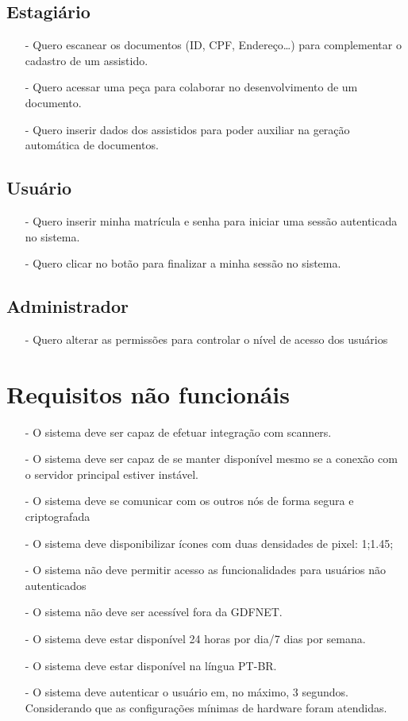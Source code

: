 \documentclass[12pt,a4paper]{report}
\begin{document}
\section{Estagiário}
\begin{itemize}
\item[-] Quero escanear os documentos (ID, CPF, Endereço…) para complementar o cadastro de um assistido.
\item[-] Quero acessar uma peça para colaborar no desenvolvimento de um documento.
\item[-] Quero inserir dados dos assistidos para poder auxiliar na geração automática de documentos.
\end{itemize}

\section{Usuário}
\begin{itemize}
\item[-] Quero inserir minha matrícula e senha para iniciar uma sessão autenticada no sistema.
\item[-] Quero clicar no botão para finalizar a minha sessão no sistema.
\end{itemize}

\section{Administrador}
\begin{itemize}
\item[-] Quero alterar as permissões para controlar o nível de acesso dos usuários
\end{itemize}

\chapter{Requisitos não funcionáis}
\begin{itemize}
\item[-]  O sistema deve ser capaz de efetuar integração com scanners.
\item[-]  O sistema deve ser capaz de se manter disponível mesmo se a conexão com o servidor principal estiver instável.
\item[-]  O sistema deve se comunicar com os outros nós de forma segura e criptografada
\item[-]  O sistema deve disponibilizar ícones com duas densidades de pixel: 1;1.45;
\item[-]  O sistema não deve permitir acesso as funcionalidades para usuários não autenticados
\item[-]  O sistema não deve ser acessível fora da GDFNET.
\item[-]  O sistema deve estar disponível 24 horas por dia/7 dias por semana.
\item[-]  O sistema deve estar disponível na língua PT-BR.
\item[-]  O sistema deve autenticar o usuário em, no máximo, 3 segundos. Considerando que as configurações mínimas de hardware foram atendidas.
\end{itemize}
\end{document}
